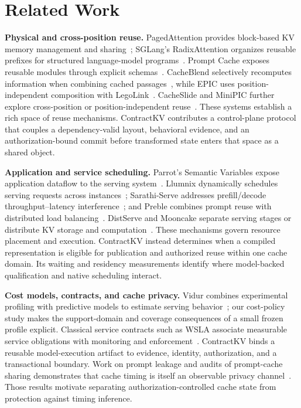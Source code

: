 \section{Related Work}
\label{sec:related}

\noindent\textbf{Physical and cross-position reuse.}
PagedAttention provides block-based KV memory management and sharing~\cite{vllm2023}; SGLang's RadixAttention organizes reusable prefixes for structured language-model programs~\cite{sglang2024}. Prompt Cache exposes reusable modules through explicit schemas~\cite{promptcache2024}. CacheBlend selectively recomputes information when combining cached passages~\cite{cacheblend2025}, while EPIC uses position-independent composition with LegoLink~\cite{epic2025}. CacheSlide and MiniPIC further explore cross-position or position-independent reuse~\cite{cacheslide2026,minipic2026}. These systems establish a rich space of reuse mechanisms. ContractKV contributes a control-plane protocol that couples a dependency-valid layout, behavioral evidence, and an authorization-bound commit before transformed state enters that space as a shared object.

\noindent\textbf{Application and service scheduling.}
Parrot's Semantic Variables expose application dataflow to the serving system~\cite{parrot2024}. Llumnix dynamically schedules serving requests across instances~\cite{llumnix2024}; Sarathi-Serve addresses prefill/decode throughput--latency interference~\cite{sarathi2024}; and Preble combines prompt reuse with distributed load balancing~\cite{preble2025}. DistServe and Mooncake separate serving stages or distribute KV storage and computation~\cite{distserve2024,mooncake2025}. These mechanisms govern resource placement and execution. ContractKV instead determines when a compiled representation is eligible for publication and authorized reuse within one cache domain. Its waiting and residency measurements identify where model-backed qualification and native scheduling interact.

\noindent\textbf{Cost models, contracts, and cache privacy.}
Vidur combines experimental profiling with predictive models to estimate serving behavior~\cite{vidur2024}; our cost-policy study makes the support-domain and coverage consequences of a small frozen profile explicit. Classical service contracts such as WSLA associate measurable service obligations with monitoring and enforcement~\cite{wsla2003}. ContractKV binds a reusable model-execution artifact to evidence, identity, authorization, and a transactional boundary. Work on prompt leakage and audits of prompt-cache sharing demonstrates that cache timing is itself an observable privacy channel~\cite{iknow2025,auditing2025}. Those results motivate separating authorization-controlled cache state from protection against timing inference.
